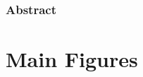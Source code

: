 \documentclass{article}
\begin{document}
\label{sec:abstract}


\begin{center}
\subsubsection*{Abstract}
\end{center}
\label{sec:abstract}

\clearpage

\linenumbers

% 

% 

% 

% 


\section{Main Figures}
\label{sec:figures}

\clearpage

\restoregeometry

% 

% 
% 
% 
% 
% 
% 
% 
\end{document}
